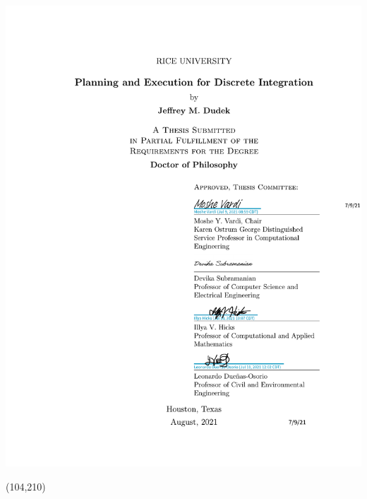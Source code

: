 \documentclass[12pt]{sty/ruthesis}
\begin{document}
\begin{frontmatter}
\begin{textblock}{80}
   	\includegraphics[page=1,clip,trim=110mm 88.4mm 10mm 180mm]{coverpage.pdf}
   \end{textblock}
   \begin{textblock}{80}(104,210)

\end{textblock}
\end{frontmatter}
\end{document}

